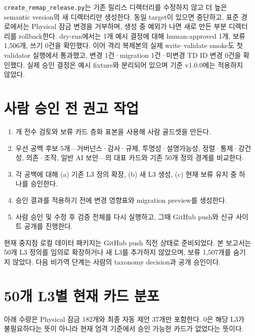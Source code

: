 \documentclass[11pt,a4paper]{article}
\newcommand{\code}[1]{\texttt{#1}}
\begin{document}
\code{create\_remap\_release.py}는 기존 릴리스 디렉터리를 수정하지 않고 더 높은 semantic version의 새 디렉터리만 생성한다. 동일 target이 있으면 중단하고, 표준 경로에서는 Physical 잠금 변경을 거부하며, 생성 중 예외가 나면 새로 만든 부분 디렉터리를 rollback한다. dry-run에서는 1개 예시 결정에 대해 human-approved 1개, 보류 1,506개, 쓰기 0건을 확인했다. 이어 격리 복제본의 실제 write--validate smoke도 첫 validator 실행에서 통과했고, 변경 1건·migration 1건·미변경 TD ID 변경 0건을 확인했다. 실제 승인 결정은 예시 fixture와 분리되어 있으며 기준 v1.0.0에는 적용하지 않았다.

\section{사람 승인 전 권고 작업}

\begin{enumerate}
  \item \FinalProposals{}개 전수 검토와 보류 카드 층화 표본을 사용해 사람 골드셋을 만든다.
  \item 우선 공백 후보 5개---거버넌스·감사·규제, 투명성·설명가능성, 정렬·통제·강건성, 의존·조작, 일반 AI 보안---의 대표 카드와 기존 50개 정의 경계를 비교한다.
  \item 각 공백에 대해 (a) 기존 L3 정의 확장, (b) 새 L3 생성, (c) 현재 보류 유지 중 하나를 승인한다.
  \item 승인 결과를 적용하기 전에 변경 영향표와 migration preview를 생성한다.
  \item 사람 승인 및 수정 후 검증 전체를 다시 실행하고, 그때 GitHub push와 신규 사이트 공개를 진행한다.
\end{enumerate}

\begin{warningbox}{현재 중지점}
로컬 데이터 패키지는 GitHub push 직전 상태로 준비되었다. 본 보고서는 50개 L3 정의를 임의로 확장하거나 새 L3를 추가하지 않았으며, 보류 1,507개를 숨기지 않았다. 다음 비가역 단계는 사람의 taxonomy decision과 공개 승인이다.
\end{warningbox}

\appendix

\section{50개 L3별 현재 카드 분포}

아래 수량은 Physical 잠금 182개와 최종 자동 제안 37개만 포함한다. 0은 해당 L3가 불필요하다는 뜻이 아니라 현재 엄격 기준에서 승인 가능한 카드가 없었다는 뜻이다.
\end{document}
